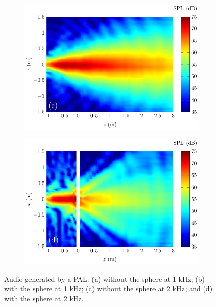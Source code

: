 \begin{figure}[!htb]
\begin{subfigure}{0.49\textwidth}
        \includegraphics[width = \textwidth]{fig/Exp_AnalyzeData_211211R_2000Hz_NoSphere_211211U}
    \end{subfigure}
    \begin{subfigure}{0.49\textwidth}
        \centering
        \includegraphics[width = \textwidth]{fig/Exp_AnalyzeData_211211R_2000Hz_Sphere_211211V}
    \end{subfigure}
    \caption{Audio  generated by a PAL: (a) without the sphere at 1 kHz; (b) with the sphere at 1 kHz; (c) without the sphere at 2 kHz; and (d) with the sphere at 2 kHz.}
    \label{fig:scat_exp_result_2d}
\end{figure}


